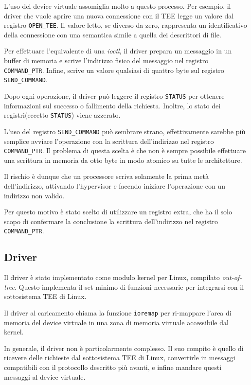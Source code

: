 \documentclass[12pt,italian]{report}
\begin{document}
L'uso del device virtuale assomiglia molto a questo processo.
Per esempio, il driver che vuole aprire una nuova connessione con il TEE
legge un valore dal registro \texttt{OPEN\_TEE}.
Il valore letto, se diverso da zero, rappresenta un identificativo
della connessione con una semantica simile a quella dei descrittori
di file.

Per effettuare l'equivalente di una \textit{ioctl}, il driver
prepara un messaggio in un buffer di memoria e scrive l'indirizzo
fisico del messaggio nel registro \texttt{COMMAND\_PTR}.
Infine, scrive un valore qualsiasi di quattro byte sul registro
\texttt{SEND\_COMMAND}.

Dopo ogni operazione, il driver può leggere il registro \texttt{STATUS}
per ottenere informazioni sul successo o fallimento della richiesta.
Inoltre, lo stato dei registri(eccetto \texttt{STATUS}) viene azzerato.

\bigbreak \noindent

L'uso del registro \texttt{SEND\_COMMAND} può sembrare strano,
effettivamente sarebbe più semplice avviare l'operazione con la
scrittura dell'indirizzo nel registro \texttt{COMMAND\_PTR}.
Il problema di questa scelta è che non è sempre possibile effettuare
una scrittura in memoria da otto byte in modo atomico su tutte le
architetture.

Il rischio è dunque che un processore scriva solamente la prima metà
dell'indirizzo, attivando l'hypervisor e facendo iniziare l'operazione
con un indirizzo non valido.

Per questo motivo è stato scelto di utilizzare un registro extra, che
ha il solo scopo di confermare la conclusione la scrittura dell'indirizzo
nel registro \texttt{COMMAND\_PTR}.

\subsection{Driver}
\label{subsection:driver}
Il driver è stato implementato come modulo kernel per Linux, compilato
\textit{out-of-tree}.
Questo implementa il set minimo di funzioni necessarie per integrarsi con
il sottosistema TEE di Linux.

Il driver al caricamento chiama la funzione \texttt{ioremap} per ri-mappare
l'area di memoria del device virtuale in una zona di memoria virtuale
accessibile dal kernel.

In generale, il driver non è particolarmente complesso.
Il suo compito è quello di ricevere delle richieste dal sottosistema TEE
di Linux, convertirle in messaggi compatibili con il protocollo descritto
più avanti, e infine mandare questi messaggi al device virtuale.
\end{document}
